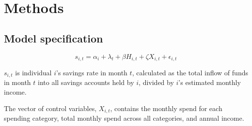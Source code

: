 
\section{Methods}%
\label{sec:methods}



\subsection{Model specification}%
\label{sub:model_specification}



\begin{equation}
    s_{i,t} = \alpha_i + \lambda_t + \beta H_{i,t} + \zeta X_{i,t} + \epsilon_{i,t}
\end{equation}

$s_{i,t}$ is individual $i$'s savings rate in month $t$, calculated as the
total inflow of funds in month $t$ into all savings accounts held by $i$,
divided by $i$'s estimated monthly income.

The vector of control variables, $X_{i,t}$, contains the monthly spend for each
spending category, total monthly spend across all categories, and annual income.




